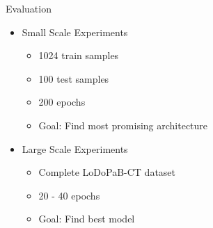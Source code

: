 \begin{frame}{Evaluation}
\begin{itemize}
    \item Small Scale Experiments
    \begin{itemize}
        \item 1024 train samples
        \item 100 test samples
        \item 200 epochs
        \item<2> \alert{Goal: Find most promising architecture}
    \end{itemize}
    \item Large Scale Experiments
    \begin{itemize}
        \item Complete LoDoPaB-CT dataset
        \item 20 - 40 epochs
        \item<2> \alert{Goal: Find best model}
    \end{itemize}
\end{itemize}
\end{frame}

